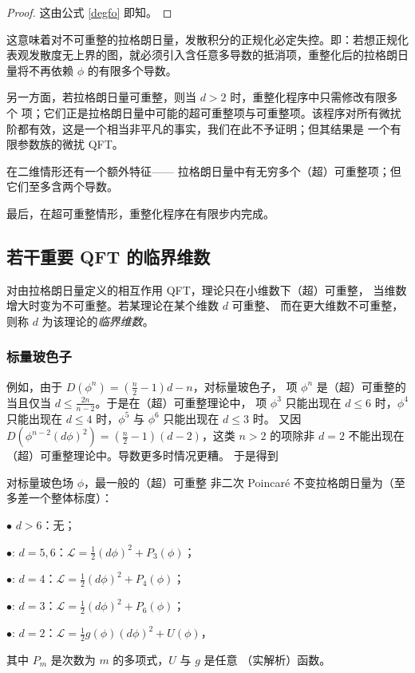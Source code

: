 \begin{proof} 这由公式 \eqref{degfo} 即知。
\end{proof}

这意味着对不可重整的拉格朗日量，发散积分的正规化必定失控。即：若想正规化
表观发散度无上界的图，就必须引入含任意多导数的抵消项，重整化后的拉格朗日量将不再依赖 $\phi$ 的有限多个导数。

另一方面，若拉格朗日量可重整，则当 $d>2$ 时，重整化程序中只需修改有限多个
项；它们正是拉格朗日量中可能的超可重整项与可重整项。该程序对所有微扰阶都有效，这是一个相当非平凡的事实，我们在此不予证明；但其结果是
一个有限参数族的微扰 QFT。

在二维情形还有一个额外特征——
拉格朗日量中有无穷多个（超）可重整项；但它们至多含两个导数。

最后，在超可重整情形，重整化程序在有限步内完成。

\subsection{若干重要 QFT 的临界维数}\label{critthe}

对由拉格朗日量定义的相互作用 QFT，理论只在小维数下（超）可重整，
当维数增大时变为不可重整。若某理论在某个维数 $d$ 可重整、
而在更大维数不可重整，则称 $d$ 为该理论的\emph{临界维数}。

\subsubsection{标量玻色子}
例如，由于 $D(\phi^n)=(\tfrac{n}{2}-1)d-n$，对标量玻色子，
项 $\phi^n$ 是（超）可重整的当且仅当
$d\le \frac{2n}{n-2}$。于是在（超）可重整理论中，
项 $\phi^3$ 只能出现在 $d\le 6$ 时，$\phi^4$
只能出现在 $d\le 4$ 时，$\phi^5$ 与 $\phi^6$ 只能出现在 $d\le 3$ 时。
又因 $D(\phi^{n-2}(d\phi)^2)=(\tfrac{n}{2}-1)(d-2)$，这类 $n>2$ 的项除非 $d=2$
不能出现在（超）可重整理论中。导数更多时情况更糟。
于是得到

\begin{proposition} 对标量玻色场 $\phi$，最一般的（超）可重整
非二次 Poincaré 不变拉格朗日量为（至多差一个整体标度）：

$\bullet$ $d>6$：无；

$\bullet$: $d=5,6$：$\mathcal L=\frac{1}{2}(d \phi)^2+P_3(\phi)$；

$\bullet$: $d=4$：$\mathcal L=\frac{1}{2}(d \phi)^2+P_4(\phi)$；

$\bullet$: $d=3$：$\mathcal L=\frac{1}{2}(d \phi)^2+P_6(\phi)$；

$\bullet$: $d=2$：$\mathcal L=\frac{1}{2}g(\phi)(d \phi)^2+U(\phi)$，

其中 $P_m$ 是次数为 $m$ 的多项式，$U$ 与 $g$ 是任意
（实解析）函数。
\end{proposition}

